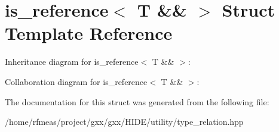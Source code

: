 \hypertarget{structis__reference_3_01T_01_6_6_01_4}{}\section{is\+\_\+reference$<$ T \&\& $>$ Struct Template Reference}
\label{structis__reference_3_01T_01_6_6_01_4}


Inheritance diagram for is\+\_\+reference$<$ T \&\& $>$\+:


Collaboration diagram for is\+\_\+reference$<$ T \&\& $>$\+:


The documentation for this struct was generated from the following file\+:\begin{DoxyCompactItemize}
\item 
/home/rfmeas/project/gxx/gxx/\+H\+I\+D\+E/utility/type\+\_\+relation.\+hpp\end{DoxyCompactItemize}
